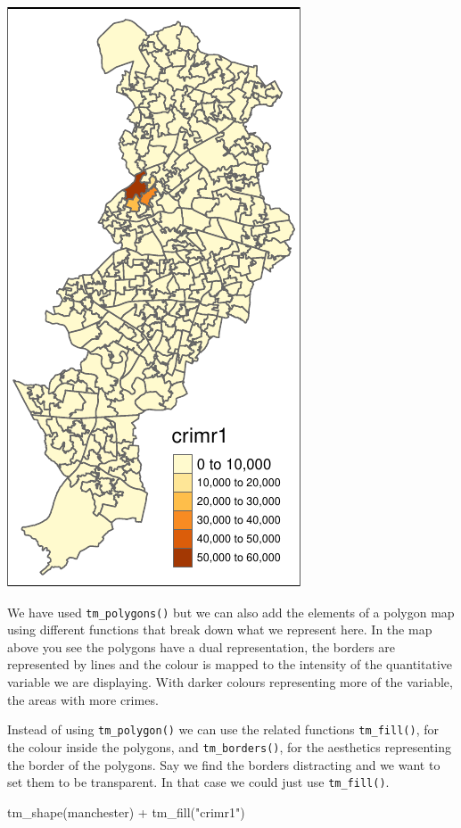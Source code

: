 \documentclass[
]{book}
\makeatletter
\newenvironment{Shaded}{\begin{snugshade}}{\end{snugshade}}
\newcommand{\FunctionTok}[1]{\textcolor[rgb]{0,0,0}{#1}}
\newcommand{\NormalTok}[1]{#1}
\newcommand{\SpecialCharTok}[1]{\textcolor[rgb]{0,0,0}{#1}}
\newcommand{\StringTok}[1]{\textcolor[rgb]{0.5,0.5,0.5}{#1}}
\newenvironment{kframe}{%
\medskip{}
\setlength{\fboxsep}{.8em}
 \def\at@end@of@kframe{}%
 \ifinner\ifhmode%
  \def\at@end@of@kframe{\end{minipage}}%
  \begin{minipage}{\columnwidth}%
 \fi\fi%
 \def\FrameCommand##1{\hskip\@totalleftmargin \hskip-\fboxsep
 \colorbox{shadecolor}{##1}\hskip-\fboxsep
     \hskip-\linewidth \hskip-\@totalleftmargin \hskip\columnwidth}%
 \MakeFramed {\advance\hsize-\width
   \@totalleftmargin\z@ \linewidth\hsize
   \@setminipage}}%
 {\par\unskip\endMakeFramed%
 \at@end@of@kframe}
\renewenvironment{Shaded}{\begin{kframe}}{\end{kframe}}
\makeatother
\begin{document}
\includegraphics{crime_mapping_files/figure-latex/unnamed-chunk-84-1.pdf}

We have used \texttt{tm\_polygons()} but we can also add the elements of a polygon map using different functions that break down what we represent here. In the map above you see the polygons have a dual representation, the borders are represented by lines and the colour is mapped to the intensity of the quantitative variable we are displaying. With darker colours representing more of the variable, the areas with more crimes.

Instead of using \texttt{tm\_polygon()} we can use the related functions \texttt{tm\_fill()}, for the colour inside the polygons, and \texttt{tm\_borders()}, for the aesthetics representing the border of the polygons. Say we find the borders distracting and we want to set them to be transparent. In that case we could just use \texttt{tm\_fill()}.

\begin{Shaded}
\begin{Highlighting}[]
\FunctionTok{tm\_shape}\NormalTok{(manchester) }\SpecialCharTok{+} 
  \FunctionTok{tm\_fill}\NormalTok{(}\StringTok{"crimr1"}\NormalTok{)}
\end{Highlighting}
\end{Shaded}
\end{document}
